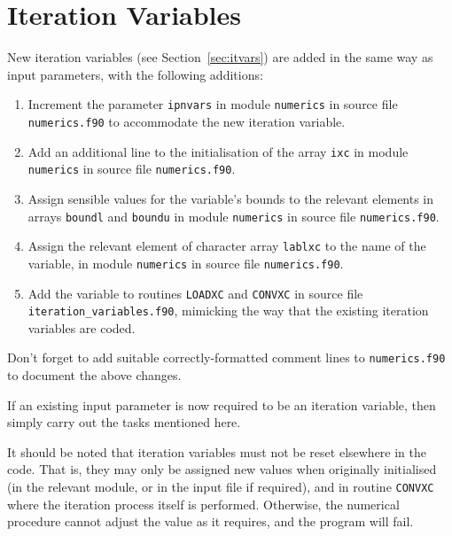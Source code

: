 \documentclass[11pt,a4paper]{report}
\begin{document}
\section{Iteration Variables}

New iteration variables (see Section~\ref{sec:itvars}) are added in the
same way as input parameters, with the following additions:

\begin{enumerate}

\item Increment the parameter \texttt{ipnvars} in module \texttt{numerics} in
  source file \texttt{numerics.f90} to accommodate the new iteration variable.

\item Add an additional line to the initialisation of the array \texttt{ixc}
  in module \texttt{numerics} in source file \texttt{numerics.f90}.

\item Assign sensible values for the variable's bounds to the relevant
  elements in arrays \texttt{boundl} and \texttt{boundu} in module
  \texttt{numerics} in source file \texttt{numerics.f90}.

\item Assign the relevant element of character array \texttt{lablxc} to the
  name of the variable, in module \texttt{numerics} in source file
  \texttt{numerics.f90}.

\item Add the variable to routines \texttt{LOADXC} and \texttt{CONVXC} in
  source file \texttt{iteration\_variables.f90}, mimicking the way that the
  existing iteration variables are coded.

\end{enumerate}

Don't forget to add suitable correctly-formatted comment lines to
\texttt{numerics.f90} to document the above changes.

If an existing input parameter is now required to be an iteration variable,
then simply carry out the tasks mentioned here.

It should be noted that iteration variables must not be reset elsewhere in the
code. That is, they may only be assigned new values when originally
initialised (in the relevant module, or in the input file if required), and in
routine \texttt{CONVXC} where the iteration process itself is performed.
Otherwise, the numerical procedure cannot adjust the value as it requires, and
the program will fail.
\end{document}
